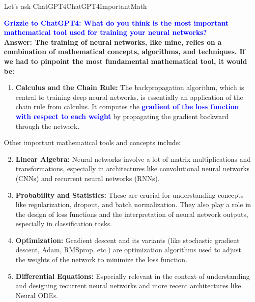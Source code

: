 \begin{funColor}{Let's ask ChatGPT4}{ChatGPT4ImportantMath}
    
\textcolor{blue}{\bf \large Grizzle to ChatGPT4: What do you think is the most important mathematical tool used for training your neural networks?}\\

\textbf{Answer: The training of neural networks, like mine, relies on a combination of mathematical concepts, algorithms, and techniques. If we had to pinpoint the most fundamental mathematical tool, it would be:}

\begin{enumerate}
    \item \textbf{Calculus and the Chain Rule:} The backpropagation algorithm, which is central to training deep neural networks, is essentially an application of the chain rule from calculus. It computes the \textcolor{blue}{\bf gradient of the loss function with respect to each weight} by propagating the gradient backward through the network.
\end{enumerate}

Other important mathematical tools and concepts include:

\begin{enumerate}
    \setcounter{enumi}{1}
    \item \textbf{Linear Algebra:} Neural networks involve a lot of matrix multiplications and transformations, especially in architectures like convolutional neural networks (CNNs) and recurrent neural networks (RNNs).
    
    \item \textbf{Probability and Statistics:} These are crucial for understanding concepts like regularization, dropout, and batch normalization. They also play a role in the design of loss functions and the interpretation of neural network outputs, especially in classification tasks.
    
    \item \textbf{Optimization:} Gradient descent and its variants (like stochastic gradient descent, Adam, RMSprop, etc.) are optimization algorithms used to adjust the weights of the network to minimize the loss function.
    
    \item \textbf{Differential Equations:} Especially relevant in the context of understanding and designing recurrent neural networks and more recent architectures like Neural ODEs.
    

\end{enumerate}
\end{funColor}
